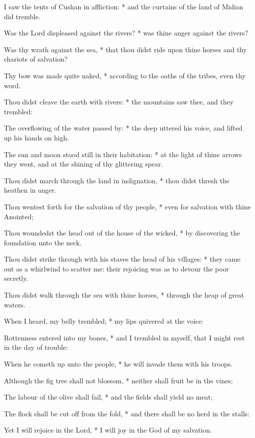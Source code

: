 \begin{multicols}{2}
I saw the tents of Cushan in affliction: * and the curtains of the land of Midian did tremble.\par
Was the Lord displeased against the rivers? * was thine anger against the rivers?\par
Was thy wrath against the sea, * that thou didst ride upon thine horses and thy chariots of salvation?\par
Thy bow was made quite naked, * according to the oaths of the tribes, even thy word.\par
Thou didst cleave the earth with rivers: * the mountains saw thee, and they trembled:\par
The overflowing of the water passed by: * the deep uttered his voice, and lifted up his hands on high.\par
The sun and moon stood still in their habitation: * at the light of thine arrows they went, and at the shining of thy glittering spear.\par
Thou didst march through the land in indignation, * thou didst thresh the heathen in anger.\par
Thou wentest forth for the salvation of thy people, * even for salvation with thine Anointed;\par
Thou woundedst the head out of the house of the wicked, * by discovering the foundation unto the neck.\par
Thou didst strike through with his staves the head of his villages: * they came out as a whirlwind to scatter me: their rejoicing was as to devour the poor secretly.\par
Thou didst walk through the sea with thine horses, * through the heap of great waters.\par
When I heard, my belly trembled; * my lips quivered at the voice:\par
Rottenness entered into my bones, * and I trembled in myself, that I might rest in the day of trouble:\par
When he cometh up unto the people, * he will invade them with his troops.\par
Although the fig tree shall not blossom, * neither shall fruit be in the vines;\par
The labour of the olive shall fail, * and the fields shall yield no meat;\par
The flock shall be cut off from the fold, * and there shall be no herd in the stalls:\par
Yet I will rejoice in the Lord, * I will joy in the God of my salvation.\par

\end{multicols}
